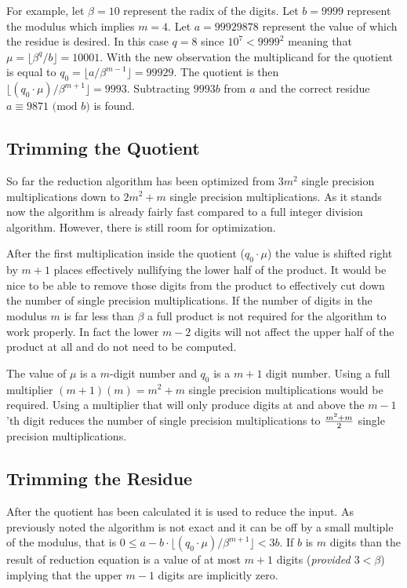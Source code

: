 \documentclass[b5paper]{book}
\begin{document}
For example, let $\beta = 10$ represent the radix of the digits.  Let $b = 9999$ represent the modulus which implies $m = 4$. Let $a = 99929878$ 
represent the value of which the residue is desired.  In this case $q = 8$ since $10^7 < 9999^2$ meaning that $\mu = \lfloor \beta^{q}/b \rfloor = 10001$.  
With the new observation the multiplicand for the quotient is equal to $q_0 = \lfloor a / \beta^{m - 1} \rfloor = 99929$.  The quotient is then 
$\lfloor (q_0 \cdot \mu) / \beta^{m+1} \rfloor = 9993$.  Subtracting $9993b$ from $a$ and the correct residue $a \equiv 9871 \mbox{ (mod }b\mbox{)}$ 
is found.  

\subsection{Trimming the Quotient}
So far the reduction algorithm has been optimized from $3m^2$ single precision multiplications down to $2m^2 + m$ single precision multiplications.  As 
it stands now the algorithm is already fairly fast compared to a full integer division algorithm.  However, there is still room for
optimization.  

After the first multiplication inside the quotient ($q_0 \cdot \mu$) the value is shifted right by $m + 1$ places effectively nullifying the lower
half of the product.  It would be nice to be able to remove those digits from the product to effectively cut down the number of single precision 
multiplications.  If the number of digits in the modulus $m$ is far less than $\beta$ a full product is not required for the algorithm to work properly.  
In fact the lower $m - 2$ digits will not affect the upper half of the product at all and do not need to be computed.  

The value of $\mu$ is a $m$-digit number and $q_0$ is a $m + 1$ digit number.  Using a full multiplier $(m + 1)(m) = m^2 + m$ single precision
multiplications would be required.  Using a multiplier that will only produce digits at and above the $m - 1$'th digit reduces the number
of single precision multiplications to ${m^2 + m} \over 2$ single precision multiplications.  

\subsection{Trimming the Residue}
After the quotient has been calculated it is used to reduce the input.  As previously noted the algorithm is not exact and it can be off by a small
multiple of the modulus, that is $0 \le a - b \cdot \lfloor (q_0 \cdot \mu) / \beta^{m+1} \rfloor < 3b$.  If $b$ is $m$ digits than the 
result of reduction equation is a value of at most $m + 1$ digits (\textit{provided $3 < \beta$}) implying that the upper $m - 1$ digits are
implicitly zero.  
\end{document}
